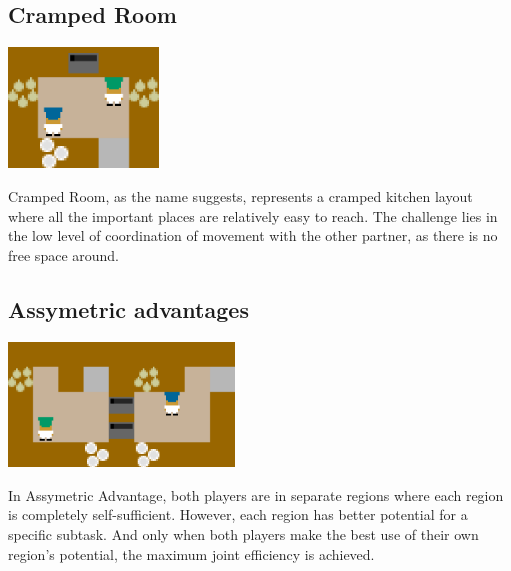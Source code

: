 \par 
\subsection*{Cramped Room}\label{CrampedRoom}
\begin{center}
    \includegraphics*[width=4cm]{../img/cramped_room_layout.png}
\end{center}
Cramped Room, as the name suggests, represents a cramped kitchen layout where all the important places are relatively easy to reach. The challenge lies in the low level of coordination of movement with the other partner, as there is no free space around.

    

\subsection*{Assymetric advantages}
\begin{center}
    \includegraphics*[width=6cm]{../img/asymmetric_advantages_layout.png}
\end{center}
In Assymetric Advantage, both players are in separate regions where each region is completely self-sufficient. However, each region has better potential for a specific subtask. 
And only when both players make the best use of their own region's potential, the maximum joint efficiency is achieved.

